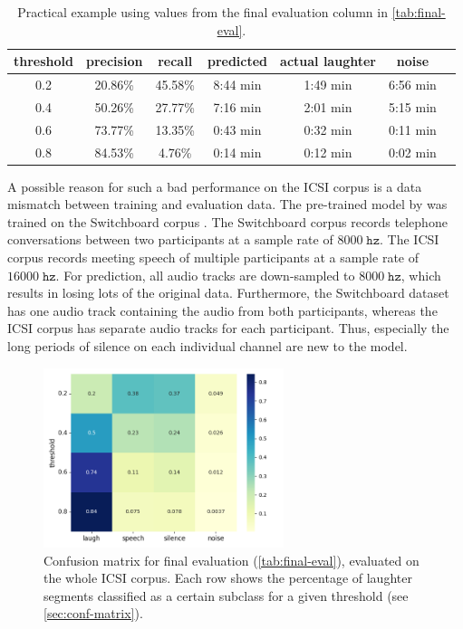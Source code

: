 \documentclass[bsc,frontabs,parskip,deptreport]{infthesis}
\newcommand{\confmatrixcaption}{Each row shows the percentage of laughter segments classified as a certain subclass for a given threshold (see \autoref{sec:conf-matrix}). }
\begin{document}
\begin{table}[]
    \centering
    \begin{tabular}{|c|c|c|c|c|c|c|}
      \hline
      threshold & precision & recall & predicted & actual laughter & noise \\
      \hline
      0.2 &  20.86\% & 45.58\% & 8:44 min & 1:49 min & 6:56 min \\
      0.4 &  50.26\% & 27.77\% & 7:16 min & 2:01 min & 5:15 min \\
      0.6 &  73.77\% & 13.35\% & 0:43 min & 0:32 min & 0:11 min \\
      0.8 &  84.53\% & 4.76\% & 0:14 min & 0:12 min & 0:02 min \\
      \hline
    \end{tabular}
    \caption{Practical example using values from the final evaluation column in \autoref{tab:final-eval}.}
    \label{tab:practical-example}
\end{table}


A possible reason for such a bad performance on the ICSI corpus is a data mismatch between training and evaluation data. The pre-trained model by \citet{gillick2021robust} was trained on the Switchboard corpus \citep{switchboard-corpus}. The Switchboard corpus records telephone conversations between two participants at a sample rate of $8000\;\mathtt{hz}$. The ICSI corpus records meeting speech of multiple participants at a sample rate of $16000\;\mathtt{hz}$. For prediction, all audio tracks are down-sampled to $8000\;\mathtt{hz}$, which results in losing lots of the original data. 
Furthermore, the Switchboard dataset has one audio track containing the audio from both participants, whereas the ICSI corpus has separate audio tracks for each participant. Thus, especially the long periods of silence on each individual channel are new to the model. 

\begin{figure}[h!]
    \centering
    \includegraphics[width=7cm]{imgs/conf_matrix/init_eval_all.png}
    \caption{Confusion matrix for final evaluation (\autoref{tab:final-eval}), evaluated on the whole ICSI corpus. \confmatrixcaption}
    \label{fig:initial-conf-matrix}
\end{figure}
\end{document}
